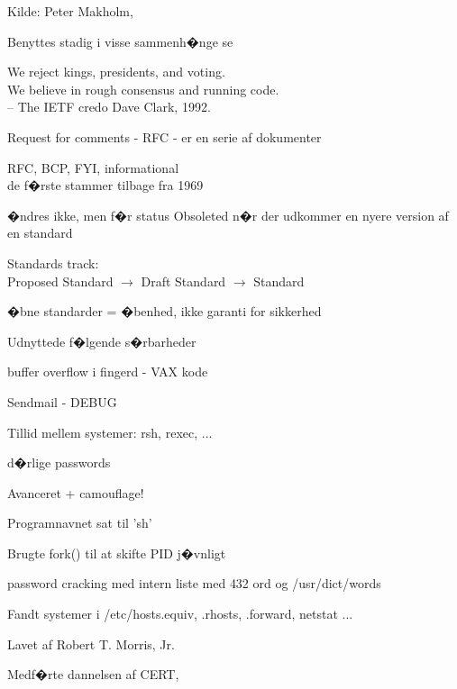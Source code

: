 \documentclass[20pt,landscape,a4paper,footrule]{foils}
\begin{document}
\begin{list1}
\item Kilde: Peter Makholm, 
\item Benyttes stadig i visse sammenh�nge se 
\end{list1}


{\hlkbig
We reject kings, presidents, and voting.\\
We believe in rough consensus and running code.\\
-- The IETF credo Dave Clark, 1992.}

\begin{list1}
\item Request for comments - RFC - er en serie af dokumenter
\item RFC, BCP, FYI, informational\\
de f�rste stammer tilbage fra 1969
\item �ndres ikke, men f�r status Obsoleted n�r der udkommer en nyere
  version af en standard
\item Standards track:\\
Proposed Standard $\rightarrow$ Draft Standard $\rightarrow$ Standard
\item  �bne standarder = �benhed, ikke garanti for sikkerhed
\end{list1}


\begin{list1}
\item Udnyttede f�lgende s�rbarheder
\begin{list2}
\item buffer overflow i fingerd - VAX kode
\item  Sendmail - DEBUG
\item Tillid mellem systemer: rsh, rexec, ...
\item d�rlige passwords
\end{list2}
\item Avanceret + camouflage!
\begin{list2}
\item Programnavnet sat til 'sh'
\item Brugte fork() til at skifte PID j�vnligt
\item password cracking med intern liste med 432 ord og /usr/dict/words
\item Fandt systemer i /etc/hosts.equiv, .rhosts, .forward, netstat ...
\end{list2}
\item Lavet af Robert T. Morris, Jr.
\item Medf�rte dannelsen af CERT, 
\end{list1}
\end{document}
